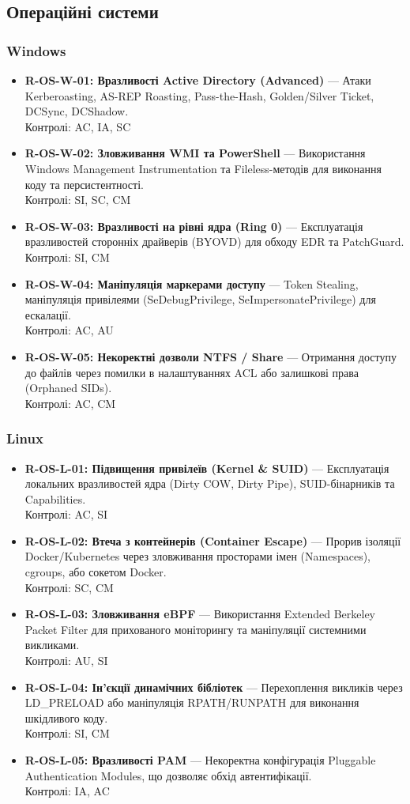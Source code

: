 \documentclass{article}
\begin{document}
\subsection{Операційні системи}
\subsubsection{Windows}
\begin{itemize}
\item \textbf{R-OS-W-01: Вразливості Active Directory (Advanced)} — Атаки Kerberoasting, AS-REP Roasting, Pass-the-Hash, Golden/Silver Ticket, DCSync, DCShadow.
\\ Контролі: AC, IA, SC
\item \textbf{R-OS-W-02: Зловживання WMI та PowerShell} — Використання Windows Management Instrumentation та Fileless-методів для виконання коду та персистентності.
\\ Контролі: SI, SC, CM
\item \textbf{R-OS-W-03: Вразливості на рівні ядра (Ring 0)} — Експлуатація вразливостей сторонніх драйверів (BYOVD) для обходу EDR та PatchGuard.
\\ Контролі: SI, CM
\item \textbf{R-OS-W-04: Маніпуляція маркерами доступу} — Token Stealing, маніпуляція привілеями (SeDebugPrivilege, SeImpersonatePrivilege) для ескалації.
\\ Контролі: AC, AU
\item \textbf{R-OS-W-05: Некоректні дозволи NTFS / Share} — Отримання доступу до файлів через помилки в налаштуваннях ACL або залишкові права (Orphaned SIDs).
\\ Контролі: AC, CM\end{itemize}
\subsubsection{Linux}
\begin{itemize}
\item \textbf{R-OS-L-01: Підвищення привілеїв (Kernel \& SUID)} — Експлуатація локальних вразливостей ядра (Dirty COW, Dirty Pipe), SUID-бінарників та Capabilities.
\\ Контролі: AC, SI
\item \textbf{R-OS-L-02: Втеча з контейнерів (Container Escape)} — Прорив ізоляції Docker/Kubernetes через зловживання просторами імен (Namespaces), cgroups, або сокетом Docker.
\\ Контролі: SC, CM
\item \textbf{R-OS-L-03: Зловживання eBPF} — Використання Extended Berkeley Packet Filter для прихованого моніторингу та маніпуляції системними викликами.
\\ Контролі: AU, SI
\item \textbf{R-OS-L-04: Ін'єкції динамічних бібліотек} — Перехоплення викликів через LD\_PRELOAD або маніпуляція RPATH/RUNPATH для виконання шкідливого коду.
\\ Контролі: SI, CM
\item \textbf{R-OS-L-05: Вразливості PAM} — Некоректна конфігурація Pluggable Authentication Modules, що дозволяє обхід автентифікації.
\\ Контролі: IA, AC\end{itemize}
\end{document}
